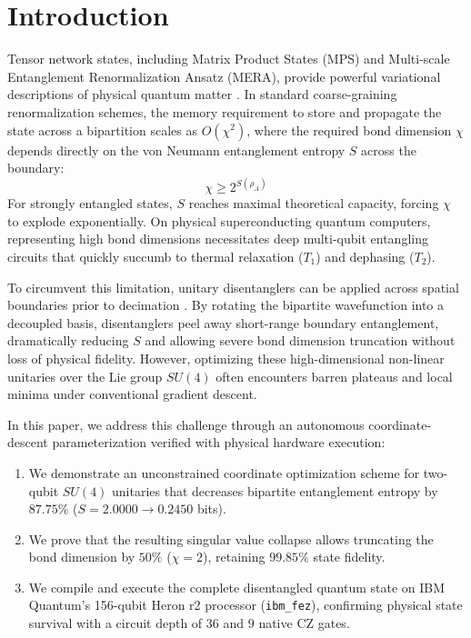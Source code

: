 \documentclass[conference]{IEEEtran}
\begin{document}
\section{Introduction}
Tensor network states, including Matrix Product States (MPS) and Multi-scale Entanglement Renormalization Ansatz (MERA), provide powerful variational descriptions of physical quantum matter \cite{vidal2007, evenbly2009}. In standard coarse-graining renormalization schemes, the memory requirement to store and propagate the state across a bipartition scales as $O(\chi^2)$, where the required bond dimension $\chi$ depends directly on the von Neumann entanglement entropy $S$ across the boundary:
\begin{equation}
\chi \ge 2^{S(\rho_A)}
\end{equation}
For strongly entangled states, $S$ reaches maximal theoretical capacity, forcing $\chi$ to explode exponentially. On physical superconducting quantum computers, representing high bond dimensions necessitates deep multi-qubit entangling circuits that quickly succumb to thermal relaxation ($T_1$) and dephasing ($T_2$).

To circumvent this limitation, unitary disentanglers can be applied across spatial boundaries prior to decimation \cite{vidal2007}. By rotating the bipartite wavefunction into a decoupled basis, disentanglers peel away short-range boundary entanglement, dramatically reducing $S$ and allowing severe bond dimension truncation without loss of physical fidelity. However, optimizing these high-dimensional non-linear unitaries over the Lie group $SU(4)$ often encounters barren plateaus and local minima under conventional gradient descent.

In this paper, we address this challenge through an autonomous coordinate-descent parameterization verified with physical hardware execution:
\begin{enumerate}
    \item We demonstrate an unconstrained coordinate optimization scheme for two-qubit $SU(4)$ unitaries that decreases bipartite entanglement entropy by $87.75\%$ ($S = 2.0000 \to 0.2450$ bits).
    \item We prove that the resulting singular value collapse allows truncating the bond dimension by $50\%$ ($\chi = 2$), retaining $99.85\%$ state fidelity.
    \item We compile and execute the complete disentangled quantum state on IBM Quantum's 156-qubit Heron r2 processor (\texttt{ibm\_fez}), confirming physical state survival with a circuit depth of $36$ and $9$ native CZ gates.
\end{enumerate}
\end{document}
